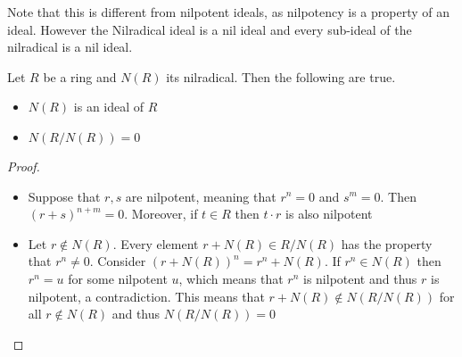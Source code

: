 \documentclass[a4paper]{article}
\begin{document}
Note that this is different from nilpotent ideals, as nilpotency is a property of an ideal. However the Nilradical ideal is a nil ideal and every sub-ideal of the nilradical is a nil ideal. 

\begin{prp}{}{} Let $R$ be a ring and $N(R)$ its nilradical. Then the following are true. 
\begin{itemize}
\item $N(R)$ is an ideal of $R$
\item $N(R/N(R))=0$
\end{itemize}\tcbline
\begin{proof}~\\
\begin{itemize}
\item Suppose that $r,s$ are nilpotent, meaning that $r^n=0$ and $s^m=0$. Then $(r+s)^{n+m}=0$. Moreover, if $t\in R$ then $t\cdot r$ is also nilpotent
\item Let $r\notin N(R)$. Every element $r+N(R)\in R/N(R)$ has the property that $r^n\neq 0$. Consider $(r+N(R))^n=r^n+N(R)$. If $r^n\in N(R)$ then $r^n=u$ for some nilpotent $u$, which means that $r^n$ is nilpotent and thus $r$ is nilpotent, a contradiction. This means that $r+N(R)\notin N(R/N(R))$ for all $r\notin N(R)$ and thus $N(R/N(R))=0$
\end{itemize}
\end{proof}
\end{prp}
\end{document}
